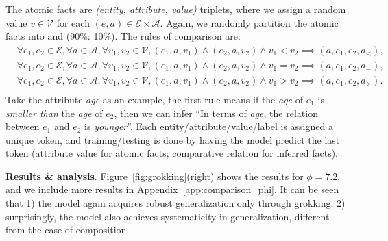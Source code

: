 The atomic facts are \textit{(entity, attribute, value)} triplets, where we assign a random value $v\in \mathcal{V}$ for each $(e, a) \in \mathcal{E}\times \mathcal{A}$. Again, we randomly partition the atomic facts into  and  (\num{90}\%: \num{10}\%). The rules of comparison are: 
\begin{equation}
\label{eq:comparison}
    \begin{aligned}
    & \forall e_1,e_2\in \mathcal{E},\forall a\in \mathcal{A}, \forall v_1,v_2\in \mathcal{V},(e_1, a, v_1)\land(e_2, a, v_2)\land v_1 < v_2 \implies (a, e_1, e_2, a_<),\\
    & \forall e_1,e_2\in \mathcal{E},\forall a\in \mathcal{A}, \forall v_1,v_2\in \mathcal{V},(e_1, a, v_1)\land(e_2, a, v_2)\land v_1=v_2 \implies (a, e_1, e_2, a_=),\\
    & \forall e_1,e_2\in \mathcal{E},\forall a\in \mathcal{A}, \forall v_1,v_2\in \mathcal{V},(e_1, a, v_1)\land(e_2, a, v_2)\land v_1>v_2 \implies (a, e_1, e_2, a_>).\\
    \end{aligned}
\end{equation}
Take the attribute \textit{age} as an example, the first rule means if the \textit{age} of $e_1$ is \textit{smaller than} the \textit{age} of $e_2$, then we can infer ``In terms of \textit{age}, the relation between $e_1$ and $e_2$ is \textit{younger}''. Each entity/attribute/value/label is assigned a unique token, and training/testing is done by having the model predict the last token (attribute value for atomic facts; comparative relation for inferred facts).

\noindent\textbf{Results \& analysis}. Figure~\ref{fig:grokking}(right) shows the results for $\phi=7.2$, and we include more results in Appendix~\ref{app:comparison_phi}. It can be seen that 1) the model again acquires robust generalization only through grokking; 2) surprisingly, the model also achieves systematicity in generalization, different from the case of composition.

